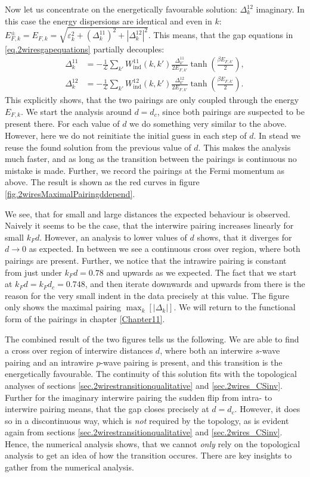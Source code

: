 Now let us concentrate on the energetically favourable solution: $\Delta^{12}_k$ imaginary. In this case the energy dispersions are identical and even in $k$: $E^{\pm}_{F,k} = E_{F,k} = \sqrt{\varepsilon_k^2 + (\Delta^{11}_k)^2 + |\Delta^{12}_k|^2}$. This means, that the gap equations in \eqref{eq.2wiresgapequations} partially decouples: 
\begin{align}
\Delta^{11}_k &= -\frac{1}{\mathcal{L}}\sum_{k'} W_{\text{ind}}^{11}(k, k')\frac{\Delta^{11}_{k'}}{2E_{F,k'}}\tanh\left(\frac{\beta E_{F,k'}}{2}\right), \nonumber \\
\Delta^{12}_k &= -\frac{1}{\mathcal{L}}\sum_{k'} W_{\text{ind}}^{12}(k, k')\frac{\Delta^{12}_{k'}}{2E_{F,k'}}\tanh\left(\frac{\beta E_{F,k'}}{2}\right).
\label{eq.2wiresgapequationsDelta12imaginary}
\end{align} 
This explicitly shows, that the two pairings are only coupled through the energy $E_{F,k}$. We start the analysis around $d = d_c$, since both pairings are suspected to be present there. For each value of $d$ we do something very similar to the above. However, here we do not reinitiate the initial guess in each step of $d$. In stead we reuse the found solution from the previous value of $d$. This makes the analysis much faster, and as long as the transition between the pairings is continuous no mistake is made. Further, we record the pairings at the Fermi momentum as above. The result is shown as the red curves in figure \ref{fig.2wiresMaximalPairingddepend}.
 
We see, that for small and large distances the expected behaviour is observed. Naively it seems to be the case, that the interwire pairing increases linearly for small $k_Fd$. However, an analysis to lower values of $d$ shows, that it diverges for $d \to 0$ as expected. In between we see a continuous cross over region, where both pairings are present. Further, we notice that the intrawire pairing is constant from just under $k_Fd = 0.78$ and upwards as we expected. The fact that we start at $k_Fd = k_Fd_c = 0.748$, and then iterate downwards and upwards from there is the reason for the very small indent in the data precisely at this value. The figure only shows the maximal pairing $\max_k[|\Delta_k|]$. We will return to the functional form of the pairings in chapter \ref{Chapter11}.

The combined result of the two figures tells us the following. We are able to find a cross over region of interwire distances $d$, where both an interwire $s$-wave pairing and an intrawire $p$-wave pairing is present, and this transition is the energetically favourable. The continuity of this solution fits with the topological analyses of sections \ref{sec.2wirestransitionqualitative} and \ref{sec.2wires_CSinv}. Further for the imaginary interwire pairing the sudden flip from intra- to interwire pairing means, that the gap closes precisely at $d = d_c$. However, it does so in a discontinuous way, which is \textit{not} required by the topology, as is evident again from sections \ref{sec.2wirestransitionqualitative} and \ref{sec.2wires_CSinv}. Hence, the numerical analysis shows, that we cannot \textit{only} rely on the topological analysis to get an idea of how the transition occures. There are key insights to gather from the numerical analysis. 



